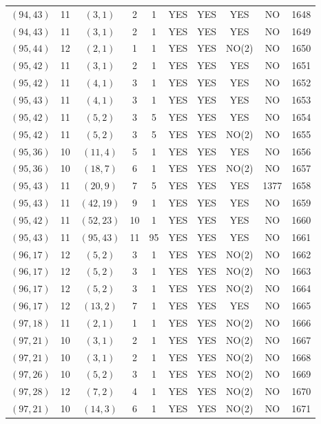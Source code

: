 \begin{longtable}{|c|c|c|c|c|c|c|c|c|c|}
$(94, 43)$ & 11 & $(3, 1)$ & 2 & 1 & YES & YES & YES & NO & 1648\\
$(94, 43)$ & 11 & $(3, 1)$ & 2 & 1 & YES & YES & YES & NO & 1649\\
$(95, 44)$ & 12 & $(2, 1)$ & 1 & 1 & YES & YES & NO(2) & NO & 1650\\
$(95, 42)$ & 11 & $(3, 1)$ & 2 & 1 & YES & YES & YES & NO & 1651\\
$(95, 42)$ & 11 & $(4, 1)$ & 3 & 1 & YES & YES & YES & NO & 1652\\
$(95, 43)$ & 11 & $(4, 1)$ & 3 & 1 & YES & YES & YES & NO & 1653\\
$(95, 42)$ & 11 & $(5, 2)$ & 3 & 5 & YES & YES & YES & NO & 1654\\
$(95, 42)$ & 11 & $(5, 2)$ & 3 & 5 & YES & YES & NO(2) & NO & 1655\\
$(95, 36)$ & 10 & $(11, 4)$ & 5 & 1 & YES & YES & YES & NO & 1656\\
$(95, 36)$ & 10 & $(18, 7)$ & 6 & 1 & YES & YES & NO(2) & NO & 1657\\
$(95, 43)$ & 11 & $(20, 9)$ & 7 & 5 & YES & YES & YES & 1377 & 1658\\
$(95, 43)$ & 11 & $(42, 19)$ & 9 & 1 & YES & YES & YES & NO & 1659\\
$(95, 42)$ & 11 & $(52, 23)$ & 10 & 1 & YES & YES & YES & NO & 1660\\
$(95, 43)$ & 11 & $(95, 43)$ & 11 & 95 & YES & YES & YES & NO & 1661\\
$(96, 17)$ & 12 & $(5, 2)$ & 3 & 1 & YES & YES & NO(2) & NO & 1662\\
$(96, 17)$ & 12 & $(5, 2)$ & 3 & 1 & YES & YES & NO(2) & NO & 1663\\
$(96, 17)$ & 12 & $(5, 2)$ & 3 & 1 & YES & YES & NO(2) & NO & 1664\\
$(96, 17)$ & 12 & $(13, 2)$ & 7 & 1 & YES & YES & YES & NO & 1665\\
$(97, 18)$ & 11 & $(2, 1)$ & 1 & 1 & YES & YES & NO(2) & NO & 1666\\
$(97, 21)$ & 10 & $(3, 1)$ & 2 & 1 & YES & YES & NO(2) & NO & 1667\\
$(97, 21)$ & 10 & $(3, 1)$ & 2 & 1 & YES & YES & NO(2) & NO & 1668\\
$(97, 26)$ & 10 & $(5, 2)$ & 3 & 1 & YES & YES & NO(2) & NO & 1669\\
$(97, 28)$ & 12 & $(7, 2)$ & 4 & 1 & YES & YES & NO(2) & NO & 1670\\
$(97, 21)$ & 10 & $(14, 3)$ & 6 & 1 & YES & YES & NO(2) & NO & 1671\\

\end{longtable}
